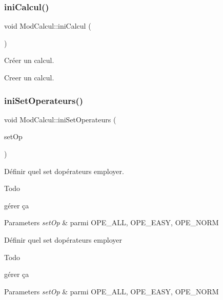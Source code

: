 \subsubsection{\texorpdfstring{ini\+Calcul()}{iniCalcul()}}
{\footnotesize\ttfamily void Mod\+Calcul\+::ini\+Calcul (\begin{DoxyParamCaption}\item[{void}]{ }\end{DoxyParamCaption})}



Créer un calcul. 

Creer un calcul. \mbox{\label{class_mod_calcul_ad6061decce032f0debf6fa79d153df5d}} 
\subsubsection{\texorpdfstring{ini\+Set\+Operateurs()}{iniSetOperateurs()}}
{\footnotesize\ttfamily void Mod\+Calcul\+::ini\+Set\+Operateurs (\begin{DoxyParamCaption}\item[{\hyperlink{class_mod_calcul_a6c7aa1fa9a9cf577567da286e26596ce}{pos\+Set\+Op}}]{set\+Op }\end{DoxyParamCaption})}



Définir quel set d\textquotesingle{}opérateurs employer. 

\begin{DoxyRefDesc}{Todo}
\item[\hyperlink{todo__todo000010}{Todo}]gérer ça \end{DoxyRefDesc}

\begin{DoxyParams}{Parameters}
{\em set\+Op} & parmi O\+P\+E\+\_\+\+A\+LL, O\+P\+E\+\_\+\+E\+A\+SY, O\+P\+E\+\_\+\+N\+O\+RM\\
\hline
\end{DoxyParams}
Définir quel set d\textquotesingle{}opérateurs employer \begin{DoxyRefDesc}{Todo}
\item[\hyperlink{todo__todo000009}{Todo}]gérer ça \end{DoxyRefDesc}

\begin{DoxyParams}{Parameters}
{\em set\+Op} & parmi O\+P\+E\+\_\+\+A\+LL, O\+P\+E\+\_\+\+E\+A\+SY, O\+P\+E\+\_\+\+N\+O\+RM \\
\hline
\end{DoxyParams}
\mbox{\label{class_mod_calcul_ab2fe81565c7084fa2c4344fce053eb14}} 
